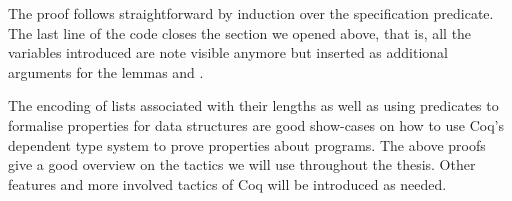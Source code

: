 The proof follows straightforward by induction over the specification predicate.
The last line of the code closes the section we opened above, that is, all the variables introduced are note visible anymore but inserted as additional arguments for the lemmas  and .


The encoding of lists associated with their lengths as well as using predicates to formalise properties for data structures are good show-cases on how to use Coq's dependent type system to prove properties about programs.
The above proofs give a good overview on the tactics we will use throughout the thesis.
Other features and more involved tactics of Coq will be introduced as needed.

%
%



